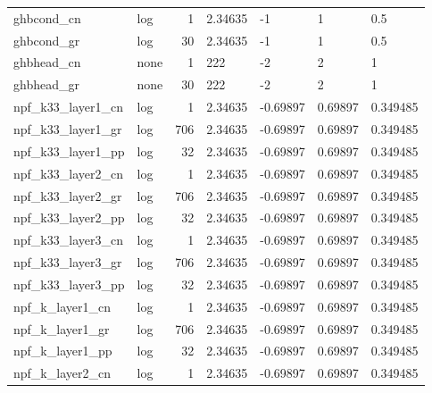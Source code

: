\documentclass{article}
\begin{document}
\begin{center}
\begin{landscape}
\begin{longtable}{llrllll}
\bottomrule
\endlastfoot
         ghbcond\_cn &       log &      1 &        2.34635 &             -1 &              1 &                0.5 \\
         ghbcond\_gr &       log &     30 &        2.34635 &             -1 &              1 &                0.5 \\
         ghbhead\_cn &      none &      1 &            222 &             -2 &              2 &                  1 \\
         ghbhead\_gr &      none &     30 &            222 &             -2 &              2 &                  1 \\
  npf\_k33\_layer1\_cn &       log &      1 &        2.34635 &       -0.69897 &        0.69897 &           0.349485 \\
  npf\_k33\_layer1\_gr &       log &    706 &        2.34635 &       -0.69897 &        0.69897 &           0.349485 \\
  npf\_k33\_layer1\_pp &       log &     32 &        2.34635 &       -0.69897 &        0.69897 &           0.349485 \\
  npf\_k33\_layer2\_cn &       log &      1 &        2.34635 &       -0.69897 &        0.69897 &           0.349485 \\
  npf\_k33\_layer2\_gr &       log &    706 &        2.34635 &       -0.69897 &        0.69897 &           0.349485 \\
  npf\_k33\_layer2\_pp &       log &     32 &        2.34635 &       -0.69897 &        0.69897 &           0.349485 \\
  npf\_k33\_layer3\_cn &       log &      1 &        2.34635 &       -0.69897 &        0.69897 &           0.349485 \\
  npf\_k33\_layer3\_gr &       log &    706 &        2.34635 &       -0.69897 &        0.69897 &           0.349485 \\
  npf\_k33\_layer3\_pp &       log &     32 &        2.34635 &       -0.69897 &        0.69897 &           0.349485 \\
    npf\_k\_layer1\_cn &       log &      1 &        2.34635 &       -0.69897 &        0.69897 &           0.349485 \\
    npf\_k\_layer1\_gr &       log &    706 &        2.34635 &       -0.69897 &        0.69897 &           0.349485 \\
    npf\_k\_layer1\_pp &       log &     32 &        2.34635 &       -0.69897 &        0.69897 &           0.349485 \\
    npf\_k\_layer2\_cn &       log &      1 &        2.34635 &       -0.69897 &        0.69897 &           0.349485 \\

\end{longtable}
\end{landscape}
\end{center}
\end{document}
